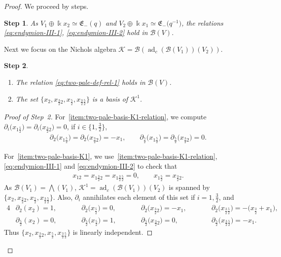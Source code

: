 \documentclass[pdftex]{sigma}
\numberwithin{equation}{section}
\newtheorem{stepiii}{Step}
\newcommand{\adc}{\operatorname{ad}_c}
\newcommand{\toba}{\mathscr B}
\newcommand{\K}{{\mathcal{K}}}
\newcommand{\eny}{\mathfrak{E}}
\newcommand{\tresdos}{\frac{3}{2}}
\newcommand{\cincodos}{\frac{5}{2}}
\begin{document}
\begin{proof} We proceed by steps.

\begin{stepiii}%
As $V_1 \oplus \Bbbk x_2 \simeq \eny_-(q)$ and $V_2 \oplus \Bbbk x_1 \simeq \eny_-\big(q^{-1}\big)$, the relations \eqref{eq:endymion-III-1}, \eqref{eq:endymion-III-2}
hold in $\toba(V)$.
\end{stepiii}

Next we focus on the Nichols algebra $\K = \toba\left(\adc(\toba(V_1))(V_2)\right)$.

\begin{stepiii}\quad%
\begin{enumerate}[label=$(\alph*)$]
\item\label{item:two-pale-basis-K1-relation}
The relation \eqref{eq:two-pale-def-rel-1} holds in $\toba(V)$.
\item\label{item:two-pale-basis-K1}
The set $\big\{x_{2}, x_{\tresdos2}, x_{\cincodos}, x_{\tresdos\cincodos} \big\}$ is a basis of $\K^1$.
\end{enumerate}
\end{stepiii}

\begin{proof}[Proof of Step~2]
For~\ref{item:two-pale-basis-K1-relation}, we compute $\partial_i\big(x_{1\cincodos}\big)= \partial_i\big(x_{\tresdos2}\big)=0$, if $i\in\big\{1,\tresdos\big\}$,
\begin{align*}
\partial_2\big(x_{1\cincodos}\big) = \partial_2\big(x_{\tresdos2}\big)=-x_1, \qquad
 \partial_{\cincodos}\big(x_{1\cincodos}\big) = \partial_{\cincodos}\big(x_{\tresdos2}\big)=0.
\end{align*}

For~\ref{item:two-pale-basis-K1}, we use~\ref{item:two-pale-basis-K1-relation}, \eqref{eq:endymion-III-1} and \eqref{eq:endymion-III-2} to check that
\begin{align*}
x_{12} = x_{1\tresdos2} = x_{1\tresdos\cincodos} = 0, \qquad x_{1\cincodos} = x_{\tresdos2}.
\end{align*}
As $\toba(V_1) = \bigwedge(V_1)$, $\K^1 = \adc(\toba(V_1))(V_2)$ is spanned by
$\big\{x_{2}, x_{\tresdos2}, x_{\cincodos}, x_{\tresdos\cincodos} \big\}$. Also, $\partial_i$ annihilates each element of this set if $i=1,\tresdos$, and
\begin{alignat*}{4}
&\partial_2(x_{2}) = 1,\qquad &&\partial_2\big(x_{\cincodos}\big) = 0, \qquad &&\partial_2\big(x_{\tresdos2}\big) = -x_1, \qquad &&\partial_2\big(x_{\tresdos\cincodos}\big) = -\big(x_\tresdos+x_1\big),
\\
&\partial_\cincodos(x_{2}) = 0, &&\partial_\cincodos\big(x_{\cincodos}\big) = 1, &&\partial_\cincodos\big(x_{\tresdos2}\big) = 0, &&\partial_\cincodos\big(x_{\tresdos\cincodos}\big) = -x_1.
\end{alignat*}
Thus $\big\{x_{2}, x_{\tresdos2}, x_{\cincodos}, x_{\tresdos\cincodos} \big\}$ is linearly independent.
\end{proof}


\end{proof}
\end{document}
